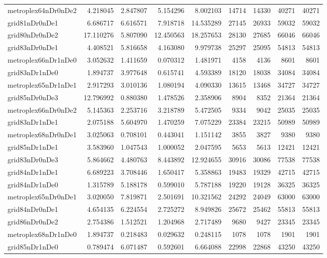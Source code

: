 \begin{longtable}{|l|r|r|r|r|r|r|r|r|}
metroplex64nDr0nDe2 & 4.218045 & 2.847807 & 5.154296 & 8.002103 & 14714 & 14330 & 40271 & 40271 \\
grid81nDr0nDe1 & 6.686717 & 6.616571 & 7.918718 & 14.535289 & 27145 & 26933 & 59032 & 59032 \\
grid80nDr0nDe2 & 17.110276 & 5.807090 & 12.450563 & 18.257653 & 28130 & 27685 & 66046 & 66046 \\
grid83nDr0nDe1 & 4.408521 & 5.816658 & 4.163080 & 9.979738 & 25297 & 25095 & 54813 & 54813 \\
metroplex66nDr1nDe0 & 3.052632 & 1.411659 & 0.070312 & 1.481971 & 4158 & 4136 & 8601 & 8601 \\
grid83nDr1nDe0 & 1.894737 & 3.977648 & 0.615741 & 4.593389 & 18120 & 18038 & 34084 & 34084 \\
metroplex65nDr1nDe1 & 2.917293 & 3.010136 & 1.080194 & 4.090330 & 13615 & 13468 & 34727 & 34727 \\
grid85nDr0nDe3 & 12.796992 & 0.880380 & 1.478526 & 2.358906 & 8904 & 8352 & 21364 & 21364 \\
metroplex66nDr0nDe2 & 5.145363 & 2.253716 & 3.218789 & 5.472505 & 9334 & 9042 & 25035 & 25035 \\
grid83nDr1nDe1 & 2.075188 & 5.604970 & 1.470259 & 7.075229 & 23384 & 23215 & 50989 & 50989 \\
metroplex68nDr0nDe1 & 3.025063 & 0.708101 & 0.443041 & 1.151142 & 3855 & 3827 & 9380 & 9380 \\
grid85nDr1nDe1 & 3.583960 & 1.047543 & 1.000052 & 2.047595 & 5653 & 5613 & 12421 & 12421 \\
grid83nDr0nDe3 & 5.864662 & 4.480763 & 8.443892 & 12.924655 & 30916 & 30086 & 77538 & 77538 \\
grid84nDr1nDe1 & 6.689223 & 3.708446 & 1.650417 & 5.358863 & 19483 & 19329 & 42715 & 42715 \\
grid84nDr1nDe0 & 1.315789 & 5.188178 & 0.599010 & 5.787188 & 19220 & 19128 & 36325 & 36325 \\
metroplex65nDr0nDe1 & 3.020050 & 7.819871 & 2.501691 & 10.321562 & 24292 & 24049 & 63000 & 63000 \\
grid84nDr0nDe1 & 4.654135 & 6.224554 & 2.725272 & 8.949826 & 25672 & 25462 & 55813 & 55813 \\
grid86nDr0nDe2 & 2.754386 & 1.512521 & 1.204968 & 2.717489 & 9680 & 9427 & 23345 & 23345 \\
metroplex68nDr1nDe0 & 1.894737 & 0.218483 & 0.029632 & 0.248115 & 1078 & 1078 & 1901 & 1901 \\
grid85nDr1nDe0 & 0.789474 & 6.071487 & 0.592601 & 6.664088 & 22998 & 22868 & 43250 & 43250 \\

\end{longtable}

